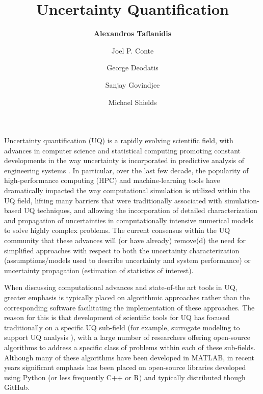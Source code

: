 %
%
%


\title{Uncertainty Quantification}
\author{
    \textbf{Alexandros Taflanidis}
    \and Joel P. Conte
    \and George Deodatis
    \and Sanjay Govindjee
    \and Michael Shields}
\tocauthor{}
%
%
\maketitle
\label{chapter:uq}

Uncertainty quantification (UQ) is a rapidly evolving scientific field, with advances in computer science and statistical computing promoting constant developments in the way uncertainty is incorporated in predictive analysis of engineering systems \citep{smith2013uncertainty}. In particular, over the last few decade, the popularity of high-performance computing (HPC) and machine-learning tools have dramatically impacted the way computational simulation is utilized within the UQ field, lifting many barriers that were traditionally associated with simulation-based UQ techniques, and allowing the incorporation of detailed characterization and propagation of uncertainties in computationally intensive numerical models to solve highly complex problems. The current consensus within the UQ community that these advances will (or have already) remove(d) the need for simplified approaches with respect to both the uncertainty characterization (assumptions/models used to describe uncertainty and system performance) or uncertainty propagation (estimation of statistics of interest). 

When discussing computational advances and state-of-the art tools in UQ, greater emphasis is typically placed on algorithmic approaches rather than the corresponding software facilitating the implementation of these approaches. The reason for this is that development of scientific tools for UQ has focused traditionally on a specific UQ sub-field (for example, surrogate modeling to support UQ analysis \citep{lophaven2002dacea,gorissen2010surrogate}), with a large number of researchers \citep[e.g.,][]{bect2017bayesian,clement2018methods} offering open-source algorithms to address a specific class of problems within each of these sub-fields. Although many of these algorithms have been developed in MATLAB, in recent years significant emphasis has been placed on open-source libraries developed using Python (or less frequently C++ or R) and typically distributed though GitHub.    


